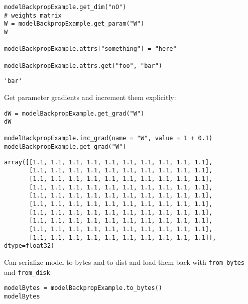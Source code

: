 \documentclass[
]{article}
\begin{document}
\begin{verbatim}
modelBackpropExample.get_dim("nO")
# weights matrix
W = modelBackpropExample.get_param("W")
W

modelBackpropExample.attrs["something"] = "here"

modelBackpropExample.attrs.get("foo", "bar")
\end{verbatim}

\begin{verbatim}
'bar'
\end{verbatim}

Get parameter gradients and increment them explicitly:

\begin{verbatim}
dW = modelBackpropExample.get_grad("W")
dW

modelBackpropExample.inc_grad(name = "W", value = 1 + 0.1)
modelBackpropExample.get_grad("W")
\end{verbatim}

\begin{verbatim}
array([[1.1, 1.1, 1.1, 1.1, 1.1, 1.1, 1.1, 1.1, 1.1, 1.1],
       [1.1, 1.1, 1.1, 1.1, 1.1, 1.1, 1.1, 1.1, 1.1, 1.1],
       [1.1, 1.1, 1.1, 1.1, 1.1, 1.1, 1.1, 1.1, 1.1, 1.1],
       [1.1, 1.1, 1.1, 1.1, 1.1, 1.1, 1.1, 1.1, 1.1, 1.1],
       [1.1, 1.1, 1.1, 1.1, 1.1, 1.1, 1.1, 1.1, 1.1, 1.1],
       [1.1, 1.1, 1.1, 1.1, 1.1, 1.1, 1.1, 1.1, 1.1, 1.1],
       [1.1, 1.1, 1.1, 1.1, 1.1, 1.1, 1.1, 1.1, 1.1, 1.1],
       [1.1, 1.1, 1.1, 1.1, 1.1, 1.1, 1.1, 1.1, 1.1, 1.1],
       [1.1, 1.1, 1.1, 1.1, 1.1, 1.1, 1.1, 1.1, 1.1, 1.1],
       [1.1, 1.1, 1.1, 1.1, 1.1, 1.1, 1.1, 1.1, 1.1, 1.1]], dtype=float32)
\end{verbatim}

Can serialize model to bytes and to dist and load them back with
\texttt{from_bytes} and \texttt{from_disk}

\begin{verbatim}
modelBytes = modelBackpropExample.to_bytes()
modelBytes
\end{verbatim}
\end{document}
